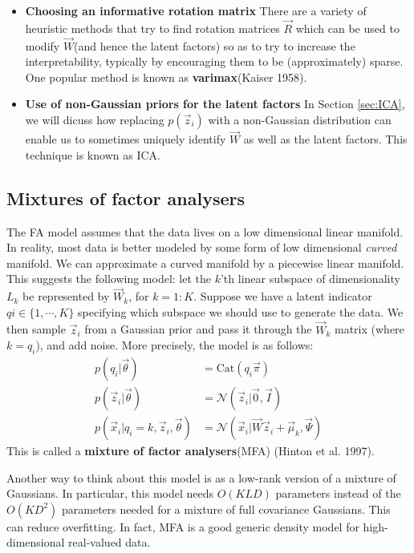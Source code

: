 \begin{itemize}
\item{\textbf{Choosing an informative rotation matrix} There are a variety of heuristic methods that try to find rotation matrices $\vec{R}$ which can be used to modify $\vec{W}$(and hence the latent factors) so as to try to increase the interpretability, typically by encouraging them to be (approximately) sparse. One popular method is known as \textbf{varimax}(Kaiser 1958).}
\item{\textbf{Use of non-Gaussian priors for the latent factors} In Section \ref{sec:ICA}, we will dicuss how replacing $p(\vec{z}_i)$ with a non-Gaussian distribution can enable us to sometimes uniquely identify $\vec{W}$ as well as the latent factors. This technique is known as ICA.}
\end{itemize}


\subsection{Mixtures of factor analysers}
The FA model assumes that the data lives on a low dimensional linear manifold. In reality, most
data is better modeled by some form of low dimensional \emph{curved} manifold. We can approximate a curved manifold by a piecewise linear manifold. This suggests the following model: let the $k$'th linear subspace of dimensionality $L_k$ be represented by $\vec{W}_k$, for $k=1:K$. Suppose we have a latent indicator $qi \in \{1,\cdots,K\}$ specifying which subspace we should use to generate the data. We then sample $\vec{z}_i$ from a Gaussian prior and pass it through the $\vec{W}_k$ matrix (where $k=q_i$), and add noise. More precisely, the model is as follows:
\begin{align}
p(q_i|\vec{\theta}) & =\mathrm{Cat}(q_i\vec{\pi}) \\
p(\vec{z}_i|\vec{\theta}) & =\mathcal{N}(\vec{z}_i|\vec{0},\vec{I}) \\
p(\vec{x}_i|q_i=k,\vec{z}_i,\vec{\theta}) & =\mathcal{N}(\vec{x}_i|\vec{W}\vec{z}_i+\vec{\mu}_k,\vec{\Psi})
\end{align}
This is called a \textbf{mixture of factor analysers}(MFA) (Hinton et al. 1997).

Another way to think about this model is as a low-rank version of a mixture of Gaussians. In particular, this model needs $O(KLD)$ parameters instead of the $O(KD^2)$ parameters needed for a mixture of full covariance Gaussians. This can reduce overfitting. In fact, MFA is a good generic density model for high-dimensional real-valued data.


